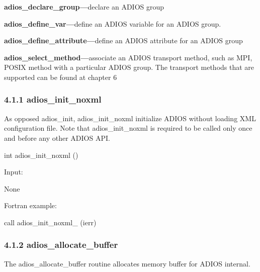 \vspace{10pt}
\textbf{adios\_declare\_group---}declare an ADIOS group 

\vspace{10pt}
\textbf{adios\_define\_var---}define an ADIOS variable for an ADIOS group.

\vspace{10pt}
\textbf{adios\_define\_attribute---}define an ADIOS attribute for an ADIOS group

\vspace{10pt}
\textbf{adios\_select\_method---}associate an ADIOS transport method, such as MPI, 
POSIX method with a particular ADIOS group. The transport methods that are supported 
can be found at chapter 6\label{HToc182553356}

\vspace{22pt}
\subsubsection*{{\large \textbf{4.1.1 adios\_init\_noxml}}}

\vspace{10pt}
As opposed adios\_init, adios\_init\_noxml initialize ADIOS without loading XML 
configuration file. Note that adios\_init\_noxml is required to be called only 
once and before any other ADIOS API. 

\vspace{10pt}
\leftskip=22pt
int adios\_init\_noxml ()

\vspace{10pt}
\leftskip=22pt
Input: 

\vspace{10pt}
\leftskip=45pt
None

\vspace{22pt}
\leftskip=22pt
Fortran example: 

\vspace{10pt}
\parindent=13pt
call adios\_init\_noxml\_ (ierr)\label{HToc182553357}

\vspace{10pt}
\subsubsection*{{\large \textbf{4.1.2 adios\_allocate\_buffer}}}

\vspace{10pt}
\leftskip=0pt
\parindent=0pt
The adios\_allocate\_buffer routine allocates memory buffer for ADIOS internal. 

